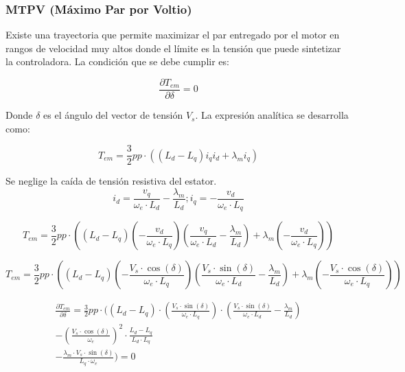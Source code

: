 \subsubsection{MTPV (Máximo Par por Voltio)}

Existe una trayectoria que permite maximizar el par entregado por el motor en rangos de velocidad muy altos donde el límite es la tensión que puede sintetizar la controladora. La condición que se debe cumplir es:

\begin{equation}
\frac{\partial T_{em}}{\partial \delta} = 0
\end{equation}

Donde $\delta$ es el ángulo del vector de tensión $V_s$. La expresión analítica se desarrolla como:

\begin{equation}
T_{em} = \frac{3}{2}pp\cdot((L_d - L_q) i_q i_d + \lambda_m i_q)
\end{equation}

Se neglige la caída de tensión resistiva del estator. 
\begin{equation}
i_d = \frac{v_q}{\omega_e \cdot L_d} - \frac{\lambda_m}{L_d}; i_q = -\frac{v_d}{\omega_e \cdot L_q}
\end{equation}

\begin{equation}
T_{em} = \frac{3}{2}pp\cdot\left((L_d - L_q) (-\frac{v_d}{\omega_e \cdot L_q}) (\frac{v_q}{\omega_e \cdot L_d} - \frac{\lambda_m}{L_d}) + \lambda_m (-\frac{v_d}{\omega_e \cdot L_q})\right)
\end{equation}

\begin{equation}
T_{em} = \frac{3}{2}pp\cdot\left((L_d - L_q) (-\frac{V_s \cdot \cos(\delta)}{\omega_e \cdot L_q}) (\frac{V_s \cdot \sin(\delta)}{\omega_e \cdot L_d} - \frac{\lambda_m}{L_d}) + \lambda_m (-\frac{V_s \cdot \cos(\delta)}{\omega_e \cdot L_q})\right)
\end{equation}

\begin{equation}
\begin{split}
\frac{\partial T_{em}}{\partial \delta} = \frac{3}{2}pp\cdot (
(L_d - L_q) \cdot (\frac{V_s \cdot \sin(\delta)}{\omega_e \cdot L_q}) \cdot (\frac{V_s \cdot \sin(\delta)}{\omega_e \cdot L_d} - \frac{\lambda_m}{L_d})\\
-\left(\frac{V_s \cdot \cos(\delta)}{\omega_e}\right)^2 \cdot \frac{L_d - L_q}{L_d\cdot L_q}\\ 
-\frac{\lambda_m \cdot V_s \cdot \sin(\delta)}{L_q \cdot \omega_e} ) = 0
\end{split}
\end{equation}


